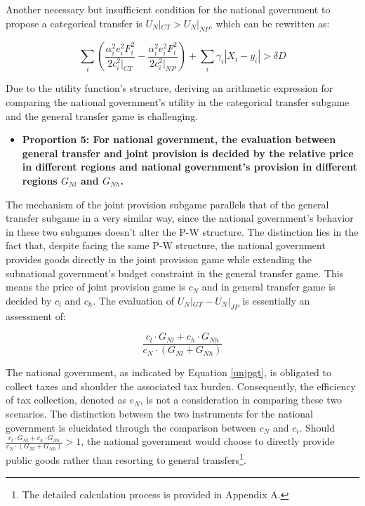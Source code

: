 \documentclass[man]{apa7}
\begin{document}
Another necessary but insufficient condition for the national government to propose a categorical transfer is $U_N|_{CT} > U_N|_{NP}$, which can be rewritten as:

\begin{equation}
  \sum_i(\frac{\alpha_i^2e_i^2F_i^2}{2c_i^2|_{CT}}-\frac{\alpha_i^2e_i^2F_i^2}{2c_i^2|_{NP}}) +\sum_i\gamma_i|X_i-y_i|>\delta D
\end{equation}

Due to the utility function's structure, deriving an arithmetic expression for comparing the national government's utility in the categorical transfer subgame and the general transfer game is challenging.%

\begin {itemize}
\item \textbf{Proportion 5: For national government, the evaluation between general transfer and joint provision is decided by the relative price in different regions and national government's provision in different regions $G_{Nl}$ and $G_{Nh}$.}
\end{itemize}


The mechanism of the joint provision subgame parallels that of the general transfer subgame in a very similar way, since the national government's behavior in these two subgames doesn't alter the P-W structure. The distinction lies in the fact that, despite facing the same P-W structure, the national government provides goods directly in the joint provision game while extending the subnational government's budget constraint in the general transfer game. This means the price of joint provision game is $c_N$ and in general transfer game is decided by $c_l$ and $c_h$. The evaluation of $U_N|_{GT}-U_N|_{JP}$ is essentially an assessment of:%


\begin{equation}
  \frac{c_l\cdot G_{Nl}+c_h\cdot G_{Nh}}{c_N\cdot (G_{Nl}+G_{Nh})}\label{unjpgt}
\end{equation} %

The national government, as indicated by Equation \ref{unjpgt}, is obligated to collect taxes and shoulder the associated tax burden. Consequently, the efficiency of tax collection, denoted as $e_N$, is not a consideration in comparing these two scenarios. The distinction between the two instruments for the national government is elucidated through the comparison between $c_N$ and $c_i$. Should $\frac{c_l\cdot G_{Nl}+c_h\cdot G_{Nh}}{c_N\cdot (G_{Nl}+G_{Nh})}>1$, the national government would choose to directly provide public goods rather than resorting to general transfers\footnote{The detailed calculation process is provided in Appendix A.}. %
\end{document}
